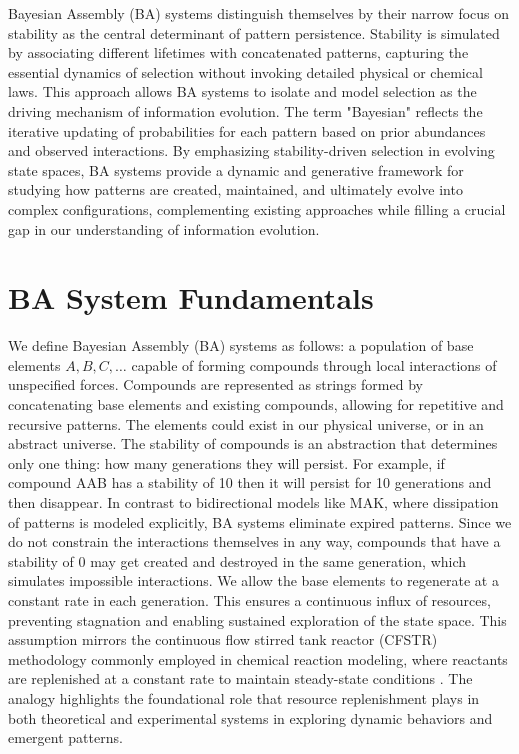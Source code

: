 \documentclass[entropy,article,submit,pdftex,moreauthors]{Definitions/mdpi}
\begin{document}
Bayesian Assembly (BA) systems distinguish themselves by their narrow focus on stability as the central determinant of pattern persistence. Stability is simulated by associating different lifetimes with concatenated patterns, capturing the essential dynamics of selection without invoking detailed physical or chemical laws. This approach allows BA systems to isolate and model selection as the driving mechanism of information evolution. The term "Bayesian" \cite{mcgrayne2011theory} reflects the iterative updating of probabilities for each pattern based on prior abundances and observed interactions. By emphasizing stability-driven selection in evolving state spaces, BA systems provide a dynamic and generative framework for studying how patterns are created, maintained, and ultimately evolve into complex configurations, complementing existing approaches while filling a crucial gap in our understanding of information evolution.

\section{BA System Fundamentals}

We define Bayesian Assembly (BA) systems as follows: a population of base elements \( A, B, C, \dots \) capable of forming compounds through local interactions of unspecified forces. Compounds are represented as strings formed by concatenating base elements and existing compounds, allowing for repetitive and recursive patterns. The elements could exist in our physical universe, or in an abstract universe. The stability of compounds is an abstraction that determines only one thing: how many generations they will persist. For example, if compound AAB has a stability of 10 then it will persist for 10 generations and then disappear. In contrast to bidirectional models like MAK, where dissipation of patterns is modeled explicitly, BA systems eliminate expired patterns. Since we do not constrain the interactions themselves in any way, compounds that have a stability of 0 may get created and destroyed in the same generation, which simulates impossible interactions. We allow the base elements to regenerate at a constant rate in each generation. This ensures a continuous influx of resources, preventing stagnation and enabling sustained exploration of the state space. This assumption mirrors the continuous flow stirred tank reactor (CFSTR) methodology commonly employed in chemical reaction modeling, where reactants are replenished at a constant rate to maintain steady-state conditions \cite{fogler1999chemical}. The analogy highlights the foundational role that resource replenishment plays in both theoretical and experimental systems in exploring dynamic behaviors and emergent patterns.
\end{document}
